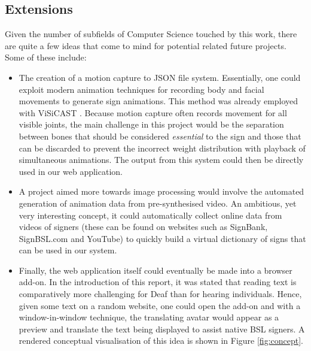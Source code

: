 \documentclass[12pt]{ociamthesis}  %
\begin{document}
\subsection{Extensions}
Given the number of subfields of Computer Science touched by this work, there are quite a few ideas that come to mind for potential related future projects. Some of these include:
\begin{itemize}
\item The creation of a motion capture to JSON file system. Essentially, one could exploit modern animation techniques for recording body and facial movements to generate sign animations. This method was already employed with ViSiCAST . Because motion capture often records movement for all visible joints, the main challenge in this project would be the separation between bones that should be considered \textit{essential} to the sign and those that can be discarded to prevent the incorrect weight distribution with playback of simultaneous animations. The output from this system could then be directly used in our web application.

\item A project aimed more towards image processing would involve the automated generation of animation data from pre-synthesised video. An ambitious, yet very interesting concept, it could automatically collect online data from videos of signers (these can be found on websites such as SignBank, SignBSL.com and YouTube) to quickly build a virtual dictionary of signs that can be used in our system. 

\item Finally, the web application itself could eventually be made into a browser add-on. In the introduction of this report, it was stated that reading text is comparatively more challenging for Deaf than for hearing individuals. Hence, given some text on a random website, one could open the add-on and with a window-in-window technique, the translating avatar would appear as a preview and translate the text being displayed to assist native BSL signers. A rendered conceptual visualisation of this idea is shown in Figure \ref{fig:concept}.
\end{itemize}
\end{document}
